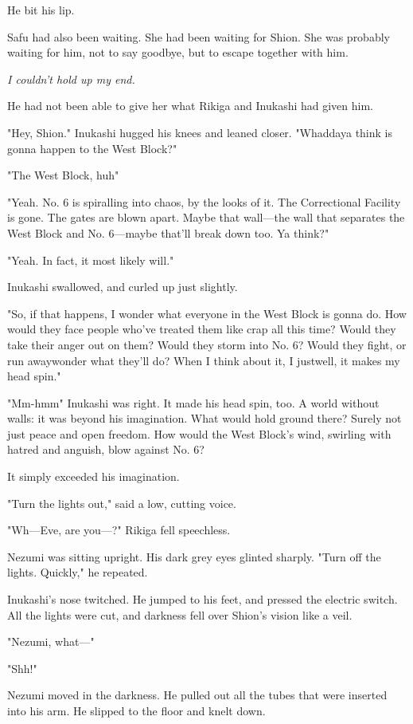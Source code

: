 He bit his lip.

Safu had also been waiting. She had been waiting for Shion. She was
probably waiting for him, not to say goodbye, but to escape together
with him.

\emph{I couldn't hold up my end.}

He had not been able to give her what Rikiga and Inukashi had given him.

"Hey, Shion." Inukashi hugged his knees and leaned closer. "Whaddaya
think is gonna happen to the West Block?"

"The West Block, huh\el "

"Yeah. No. 6 is spiralling into chaos, by the looks of it. The
Correctional Facility is gone. The gates are blown apart. Maybe that
wall---the wall that separates the West Block and No. 6---maybe that'll
break down too. Ya think?"

"Yeah. In fact, it most likely will."

Inukashi swallowed, and curled up just slightly.

"So, if that happens, I wonder what everyone in the West Block is gonna
do. How would they face people who've treated them like crap all this
time? Would they take their anger out on them? Would they storm into No.
6? Would they fight, or run away\el wonder what they'll do? When I think
about it, I just\el well, it makes my head spin."

"Mm-hmm\el " Inukashi was right. It made his head spin, too. A world
without walls: it was beyond his imagination. What would hold ground
there? Surely not just peace and open freedom. How would the West
Block's wind, swirling with hatred and anguish, blow against No. 6?

It simply exceeded his imagination.

"Turn the lights out," said a low, cutting voice.

"Wh---Eve, are you---?" Rikiga fell speechless.

Nezumi was sitting upright. His dark grey eyes glinted sharply. "Turn
off the lights. Quickly," he repeated.

Inukashi's nose twitched. He jumped to his feet, and pressed the
electric switch. All the lights were cut, and darkness fell over Shion's
vision like a veil.

"Nezumi, what---"

"Shh!"

Nezumi moved in the darkness. He pulled out all the tubes that were
inserted into his arm. He slipped to the floor and knelt down.


